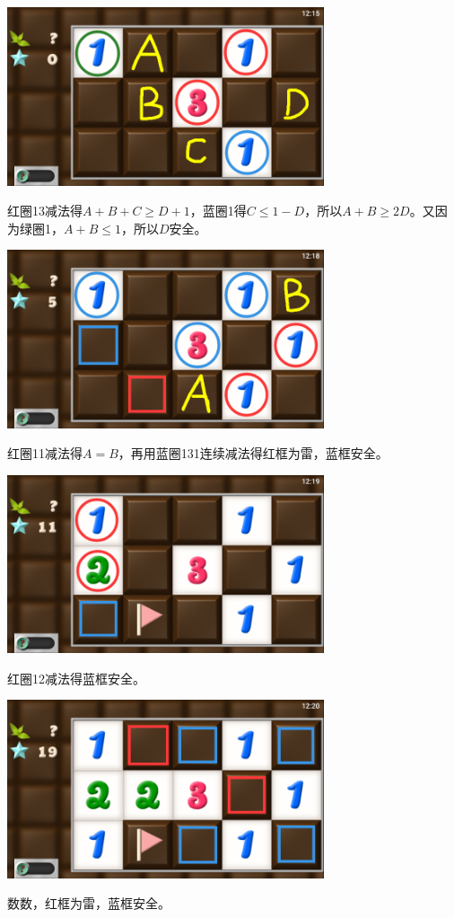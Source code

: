 \subsection{} %
\begin{center}
    \includegraphics[width=0.7\textwidth]{puzzle/81-1.png}
\end{center}
红圈13减法得$A+B+C\ge D+1$，蓝圈1得$C\le 1-D$，所以$A+B\ge 2D$。又因为绿圈1，$A+B\le 1$，所以$D$安全。
\begin{center}
    \includegraphics[width=0.7\textwidth]{puzzle/81-2.png}
\end{center}
红圈11减法得$A=B$，再用蓝圈131连续减法得红框为雷，蓝框安全。
\begin{center}
    \includegraphics[width=0.7\textwidth]{puzzle/81-3.png}
\end{center}
红圈12减法得蓝框安全。
\begin{center}
    \includegraphics[width=0.7\textwidth]{puzzle/81-4.png}
\end{center}
数数，红框为雷，蓝框安全。

